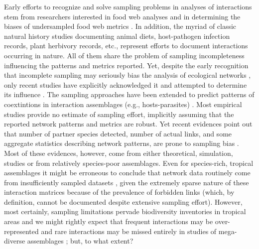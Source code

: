 \documentclass[12pt]{article}
\begin{document}
Early efforts to recognize and solve sampling problems in analyses of interactions stem from researchers interested in food web analyses and in determining the biases of undersampled food web metrics \citep{Martinez:1991aa,Cohen:1993aa,Martinez:1993ti,Bersier:2002p9371,Brose:2003wv,BanasekRichter:2004ik}. In addition, the myriad of classic natural history studies documenting animal diets, host-pathogen infection records, plant herbivory records, etc., represent efforts to document interactions occurring in nature. All of them share the problem of sampling incompleteness influencing the patterns and metrics reported. Yet, despite the early recognition that incomplete sampling may seriously bias the analysis of ecological networks \citep{E31/2562}, only recent studies have explicitly acknowledged it and attempted to determine its influence \citep{Ollerton:2002jw,Nielsen:2007,Vazquez:2009p82,Gibson:2011eh,Olesen:2011a,Chacoff:2012,RiveraHutinel:2012vn,Olito:2014gc,Bascompte:2014to,Vizentin-Bugoni:2014hc,Frund:2015ii}. The sampling approaches have been extended to predict patterns of coextintions in interaction assemblages (e.g., hosts-parasites) \citep{Colwell:2012fc}. Most empirical studies provide no estimate of sampling effort, implicitly assuming that the reported network patterns and metrics are robust. Yet recent evidences point out that number of partner species detected, number of actual links, and some aggregate statistics describing network patterns, are prone to sampling bias \citep{Nielsen:2007,Dorado:2011cf,Olesen:2011a,Chacoff:2012,RiveraHutinel:2012vn,Olito:2014gc,Frund:2015ii}. Most of these evidences, however, come from either theoretical, simulation, studies \citep{Frund:2015ii} or from relatively species-poor assemblages. Even for species-rich, tropical assemblages it might be erroneous to conclude that network data routinely come from insufficiently sampled datasets \citep{Ollerton:2002jw,Chacoff:2012}, given the extremely sparse nature of these interaction matrices because of the prevalence of forbidden links (which, by definition, cannot be documented despite extensive sampling effort). However, most certainly, sampling limitations pervade biodiversity inventories in tropical areas \citep{Coddington:2009fi} and we might rightly expect that frequent interactions may be over-represented and rare interactions may be missed entirely in studies of mega-diverse assemblages \citep{Bascompte:2014to}; but, to what extent? 

\end{document}
